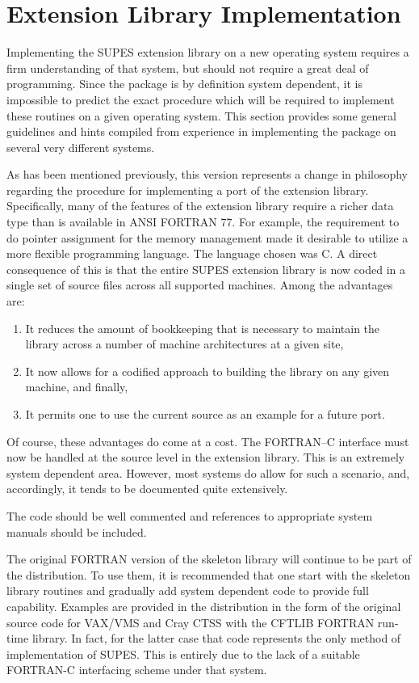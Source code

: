 \section{Extension Library Implementation}
Implementing the SUPES extension library on a new operating system
requires a firm understanding of that system, but should not require a great
deal of programming.  Since the package is by definition system dependent,
it is impossible to predict the exact procedure which will be required to
implement these routines on a given operating system.  This section provides
some general guidelines and hints compiled from experience in implementing
the package on several very different systems.

As has been mentioned previously,
this version represents a change in philosophy regarding the procedure
for implementing a port of the extension library.
Specifically,
many of the features of the extension library require a
richer data type than is available in ANSI FORTRAN 77.
For example,
the requirement to do pointer assignment for the memory management
made it desirable to utilize a more flexible programming
language.
The language chosen was C\@.
A direct consequence of this is that the
entire SUPES extension library is now coded in a single
set of source files across all supported machines.
Among the advantages are:
\begin{enumerate}

\item It reduces the amount of bookkeeping that is necessary to maintain
      the library across a number of machine architectures at a given
      site,

\item It now allows for a codified approach
      to building the library on any given machine, and finally,

\item It permits one to use the current source as an example for a
      future port.

\end{enumerate}
Of course,
these advantages do come at a cost.
The FORTRAN--C interface must now be handled at the source level
in the extension library.
This is an extremely system dependent area.
However,
most systems do allow for such a scenario,
and,
accordingly,
it tends to be documented quite extensively.

The code should be well
commented and references to appropriate system manuals should be included.

The original FORTRAN version of the skeleton library will
continue to be part of the distribution.
To use them,
it is recommended that one start with the skeleton library routines and
gradually add system dependent code to provide full capability.
Examples are provided in the distribution in the form of
the original source code for VAX/VMS and Cray CTSS with the CFTLIB
FORTRAN run-time library.
In fact,
for the latter case that code represents the only method of implementation
of SUPES.
This is entirely due to the lack of a suitable FORTRAN-C interfacing scheme
under that system.

